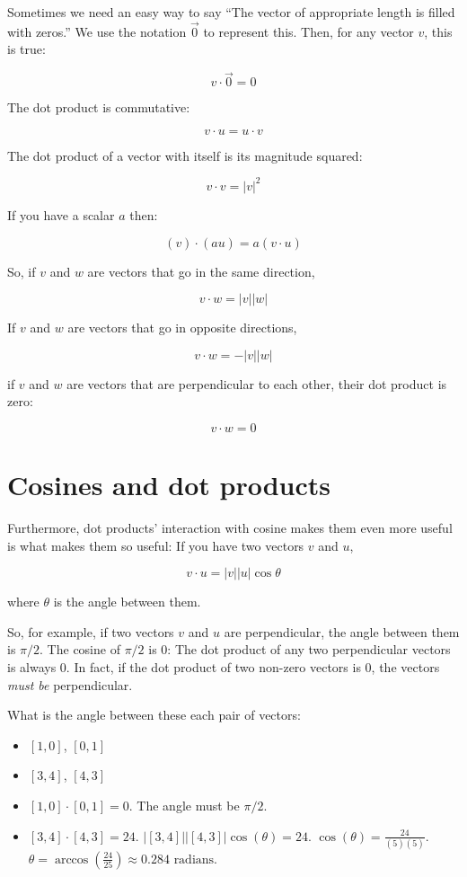 Sometimes we need an easy way to say ``The vector of appropriate length is filled with zeros.''
We use the notation $\vec{0}$ to represent this. Then, for any vector $v$, this is true:

$$v \cdot \vec{0} = 0$$

The dot product is commutative:

$$v \cdot u = u \cdot v$$

The dot product of a vector with itself is its magnitude squared:

$$ v \cdot v = |v|^2 $$

If you have a scalar $a$ then:

    $$(v) \cdot (a u) = a (v \cdot u)$$

So, if $v$ and $w$ are vectors that go in the same direction,

    $$v \cdot w = |v| |w|$$

If $v$ and $w$ are vectors that go in opposite directions,

    $$v \cdot w = -|v| |w|$$
    
if $v$ and $w$ are vectors that are perpendicular to each other, their dot product is zero:

  $$ v \cdot w = 0 $$

\section{Cosines and dot products}

Furthermore, dot products' interaction with cosine makes them even more useful is what makes them so useful: 
If you have two vectors $v$ and $u$,

$$v \cdot u = |v| |u| \cos \theta$$

where $\theta$ is the angle between them.

So, for example, if two vectors $v$ and $u$ are perpendicular, the angle between them is $\pi/2$.  
The cosine of $\pi/2$ is 0: The dot product of any two perpendicular vectors is always 0. In fact, if 
the dot product of two non-zero vectors is 0, the vectors \textit{must be} perpendicular.

\begin{Exercise}[title={Using dot products}, label=cos_dot_products]
    What is the angle between these each pair of vectors:
    \begin{itemize}
        \item $[1, 0]$, $[0, 1]$
        \item $[3,4]$, $[4,3]$
    \end{itemize}
\end{Exercise}
\begin{Answer}[ref=cos_dot_products]
        \begin{itemize}
            \item $[1,0] \cdot [0,1] = 0$.  The angle must be $\pi/2$.
            \item $[3,4] \cdot [4, 3] = 24$. $|[3,4]| |[4,3]| \cos(\theta) = 24$. 
            $\cos(\theta) = \frac{24}{(5)(5)}$. $\theta = \arccos(\frac{24}{25}) \approx 0.284 \text{ radians}$.
        \end{itemize}
\end{Answer}

